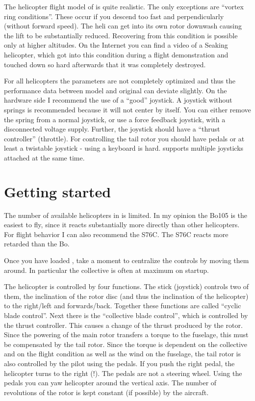 
The helicopter flight model of \FlightGear{} is 
quite realistic. The only exceptions are ``vortex ring conditions''. 
These occur if you descend too fast and perpendicularly 
(without forward speed). The heli can get into its own rotor downwash 
causing the lift to be substantially reduced. Recovering from this condition 
is possible only at higher altitudes. On the Internet you can find a video 
of a Seaking helicopter, which got into this condition during a flight 
demonstration and touched down so hard afterwards that it was completely 
destroyed. 

For all \FlightGear{} helicopters the parameters are not completely optimized 
and thus the performance data between model and original can deviate slightly. 
On the hardware side I recommend the use of a ``good'' joystick. A joystick 
without springs is recommended because it will not center by itself. You 
can either remove the spring from a normal joystick, or use a force feedback 
joystick, with a disconnected voltage supply. Further, the joystick should 
have a ``thrust controller'' (throttle). For controlling the tail rotor you 
should have pedals or at least a twistable joystick - using a keyboard is hard.
\FlightGear{} supports multiple joysticks attached at the same time. 

\section{Getting started}

The number of available helicopters in \FlightGear{} is limited. In my opinion 
the Bo105 is the easiest to fly, since it reacts substantially more directly 
than other helicopters. For flight behavior I can also recommend the S76C. 
The S76C reacts more retarded than the Bo. 

Once you have loaded \FlightGear, take a moment to centralize the controls by 
moving them around. In particular the collective is often at maximum on startup. 


The helicopter is controlled by four functions. The stick (joystick) controls 
two of them, the inclination of the rotor disc (and thus the inclination of 
the helicopter) to the right/left and forwards/back. Together these functions 
are called ``cyclic blade control''. Next there is the ``collective blade 
control'', which is controlled by the thrust controller. This causes a change 
of the thrust produced by the rotor. Since the powering of the main rotor 
transfers a torque to the fuselage, this must be compensated by the 
tail rotor. Since the torque is dependent on the collective and on the flight 
condition as well as the wind on the fuselage, the tail rotor is also 
controlled by the pilot using the pedals. If you push the right pedal, 
the helicopter turns to the right (!). The pedals are not a steering wheel. 
Using the pedals you can yaw helicopter around the vertical axis. The 
number of revolutions of the rotor is kept constant (if possible) by the 
aircraft. 

